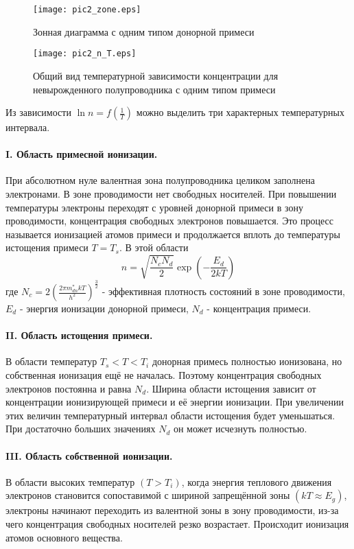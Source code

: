 \begin{figure}[h!]\centering
\texttt{[image: pic2\_zone.eps]}
\caption{Зонная диаграмма с одним типом донорной примеси}
\label{pic2_zone}
\end{figure}

\begin{figure}[h!]\centering
\texttt{[image: pic2\_n\_T.eps]}
\caption{Общий вид температурной зависимости концентрации для невырожденного полупроводника с одним типом примеси}
\label{pic2_n_T}
\end{figure}

Из зависимости $\ln n = f(\frac{1}{T})$ можно выделить три характерных температурных интервала.

\paragraph{I. Область примесной ионизации.}
При абсолютном нуле валентная зона полупроводника целиком заполнена электронами. В зоне проводимости нет свободных носителей. При повышении температуры электроны переходят с уровней донорной примеси в зону проводимости, концентрация свободных электронов повышается. Это процесс называется ионизацией атомов примеси и продолжается вплоть до температуры истощения примеси $T = T_{s}$. В этой области
\begin{equation}
n = \sqrt{\frac{N_{c}N_{d}}{2}} \exp{\left( -\frac{E_{d}}{2 k T} \right)}
\label{eq2_n_T}
\end{equation}
где $N_{c} = 2 \left( \frac{2 \pi m_{dn}^{*} k T}{h^2} \right) ^ \frac{3}{2}$ - эффективная плотность состояний в зоне проводимости, $E_{d}$ - энергия ионизации донорной примеси, $N_{d}$ - концентрация примеси.

\paragraph{II. Область истощения примеси.}
В области температур $T_{s} < T < T_{i}$ донорная примесь полностью ионизована, но собственная ионизация ещё не началась. Поэтому концентрация свободных электронов постоянна и равна $N_{d}$.
Ширина области истощения зависит от концентрации ионизирующей примеси и её энергии ионизации. При увеличении этих величин температурный интервал области истощения будет уменьшаться. При достаточно больших значениях $N_{d}$ он может исчезнуть полностью.

\paragraph{III. Область собственной ионизации.}
В области высоких температур $(T > T_{i})$, когда энергия теплового движения электронов становится сопоставимой с шириной запрещённой зоны $(k T \approx E_{g})$, электроны начинают переходить из валентной зоны в зону проводимости, из-за чего концентрация свободных носителей резко возрастает. Происходит ионизация атомов основного вещества.

